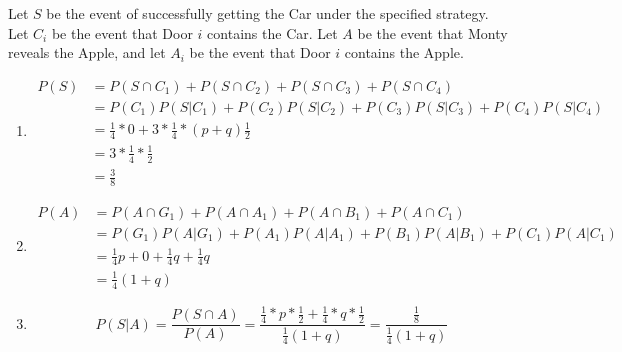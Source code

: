 Let $S$ be the event of successfully getting the Car under the specified
strategy. Let $C_{i}$ be the event that Door $i$ contains the Car. Let $A$ be
the event that Monty reveals the Apple, and let $A_{i}$ be the event that Door
$i$ contains the Apple.

\begin{enumerate}[label=(\alph*)]
\item
\begin{align*}
P(S) &= P(S \cap C_{1}) + P(S \cap C_{2}) + P(S \cap C_{3}) + P(S \cap C_{4}) \\
&= P(C_{1})P(S|C_{1}) + P(C_{2})P(S|C_{2}) + P(C_{3})P(S|C_{3}) + P(C_{4})P(S|C_
{4}) \\
&= \frac{1}{4}*0 + 3*\frac{1}{4}*(p+q)\frac{1}{2} \\
&= 3 * \frac{1}{4} * \frac{1}{2} \\
&= \frac{3}{8}
\end{align*}

\item
\begin{align*}
P(A) &= P(A \cap G_{1}) + P(A \cap A_{1}) + P(A \cap B_{1}) + P(A \cap C_{1}) \\
&= P(G_{1})P(A|G_{1}) + P(A_{1})P(A|A_{1}) + P(B_{1})P(A|B_{1}) + P(C_{1})P
(A|C_{1}) \\ 
&= \frac{1}{4}p + 0 + \frac{1}{4}q + \frac{1}{4}q \\
&= \frac{1}{4}(1 + q)
\end{align*}

\item
$$P(S|A) = \frac{P(S \cap A)}{P(A)} = 
\frac{\frac{1}{4}*p*\frac{1}{2} + \frac{1}{4}*q*\frac{1}{2}}{\frac{1}{4}(1 +
q)} = \frac{\frac{1}{8}}{\frac{1}{4}(1 + q)}$$

\end{enumerate}